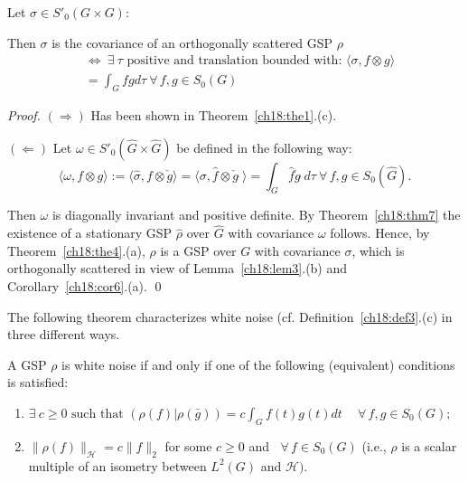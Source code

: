 \documentclass[graybox]{svmult}
\begin{document}
\setcounter{corollary}{7}

\begin{corollary}
\label{ch18:cor8}
Let $\sigma
\in {}S'_{0}(G\times G)$:

\noindent Then $\sigma $ is the covariance of
an orthogonally scattered GSP $\rho$
\begin{align*}
& \Longleftrightarrow \: \exists \:  \tau \text{ positive and translation
bounded with: }
\langle\sigma ,f\otimes g\rangle\\ & =
\int^{}_{G} fg d\tau  \ \forall \,  f,g \in S_{0}(G)
\end{align*}
\end{corollary}




\begin{proof}
$(\Rightarrow )$ Has been shown in Theorem~\ref{ch18:the1}.(c).

$(\Leftarrow )$ Let $\omega \in {}S'_{0}(\hat{G}\times
\hat{G})$ be defined in the following way:
\[
\langle\omega ,f\otimes g\rangle := \langle\hat{\sigma },f\otimes
\check{g}\rangle = \langle\sigma ,\hat{f}\otimes \check{g}
\hat{\;}\rangle = \int^{}_{G} \hat{f} \check{g} \hat{\;}d\tau \ \forall
\, f,g \in S_{0}(\hat{G}).
\]


\noindent Then $\omega $  is  diagonally  invariant  and  positive
definite.  By Theorem~\ref {ch18:thm7} the existence of a stationary GSP $\hat{\rho} $
over $\hat{G}$ with covariance $\omega $ follows.  Hence, by Theorem~\ref{ch18:the4}.(a),
$\rho $ is a GSP over $G$ with covariance $\sigma $, which is
orthogonally scattered in view of Lemma~\ref{ch18:lem3}.(b) and Corollary~\ref{ch18:cor6}.(a). \qed
\end{proof}

The following theorem characterizes white noise
(cf.  Definition~\ref{ch18:def3}.(c) in three different ways.

\setcounter{theorem}{8}
\begin{theorem}
A GSP $\rho $ is white noise if and only if one
of the following (equivalent) conditions is satisfied:
\begin{enumerate}
\item[(a)] $\exists \: c \ge 0\text{ such that }(\rho (f)| \rho (\bar{g})) = c\int^{}_{G} f(t)g(t)dt \ \quad \forall \, f,g \in {S_{0}(G)}; $

\item[(b)] $\| \rho (f)\| _{\mathcal{H}} = c\| f\| _{2}$ for
some $c \ge 0 $ and $\ \, \, \forall \, f \in {S_{0}(G)}$
(i.e., $\rho $ is
a scalar multiple of an isometry between $L^{2}(G)$ and $\mathcal{H})$.
\end{enumerate}
\end{theorem}
\end{document}
